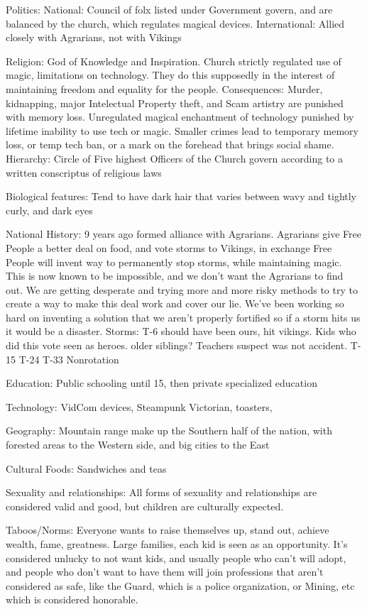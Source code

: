 \documentclass[blue]{GL2020}
\begin{document}
Politics:
	National: Council of folx listed under Government govern, and are balanced by the church, which regulates magical devices.
	International:  Allied closely with Agrarians, not with Vikings
	
Religion:		God of Knowledge and Inspiration.  Church strictly regulated use of magic, limitations on technology.  They do this supposedly in the interest of maintaining freedom and equality for the people.  
	Consequences:  Murder, kidnapping, major Intelectual Property theft, and Scam artistry are punished with memory loss.  Unregulated magical enchantment of technology punished by lifetime inability to use tech or magic.  Smaller crimes lead to temporary memory loss, or temp tech ban, or a mark on the forehead that brings social shame.
	Hierarchy:  Circle of Five highest Officers of the Church govern according to a written conscriptus of religious laws
	
	
Biological features:	Tend to have dark hair that varies between wavy and tightly curly, and dark eyes

National History:		9 years ago formed alliance with Agrarians.  Agrarians give Free People a better deal on food, and vote storms to Vikings, in exchange Free People will invent way to permanently stop storms, while maintaining magic.  This is now known to be impossible, and we don't want the Agrarians to find out.  We are getting desperate and trying more and more risky methods to try to create a way to make this deal work and cover our lie.  We've been working so hard on inventing a solution that we aren't properly fortified so if a storm hits us it would be a disaster.
	Storms:		T-6 should have been ours, hit vikings.  Kids who did this vote seen as heroes.  older siblings?  Teachers suspect was not accident.
						T-15
						T-24
						T-33
						Nonrotation
	
Education:	Public schooling until 15, then private specialized education

Technology:		VidCom devices, Steampunk Victorian, toasters, 

Geography:	Mountain range make up the Southern half of the nation, with forested areas to the Western side, and big cities to the East

Cultural Foods:	Sandwiches and teas

Sexuality and relationships:	All forms of sexuality and relationships are considered valid and good, but children are culturally expected.

Taboos/Norms:		Everyone wants to raise themselves up, stand out, achieve wealth, fame, greatness.  Large families, each kid is seen as an opportunity.  It's considered unlucky to not want kids, and usually people who can't will adopt, and people who don't want to have them will join professions that aren't considered as safe, like the Guard, which is a police organization, or Mining, etc which is considered honorable.
\end{document}
